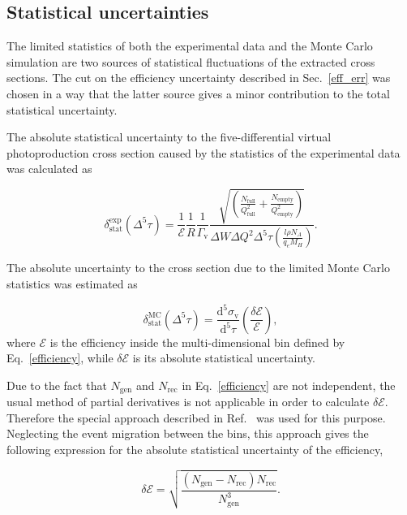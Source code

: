 \documentclass[prc,twocolumn,superscriptaddress,showpacs,amssymb,amsmath,amsfonts,aps,nofootinbib]{revtex4-1}
\begin{document}
\subsection{Statistical uncertainties}
\label{stat_unc}

The limited statistics of both the experimental data and the Monte Carlo simulation  are two sources of statistical fluctuations of the extracted cross sections.
The cut on the efficiency uncertainty described in Sec.~\ref{eff_err} was chosen in a way that the latter source gives a minor contribution to the total statistical uncertainty.


The absolute statistical  uncertainty to the five-differential
virtual photoproduction cross section caused by the statistics of the experimental data was calculated as

 \begin{equation}
\delta_{\text{stat}}^{\text{exp}}(\Delta^{5} \tau) = \frac{1}{\mathcal{E}} \frac{1}{R}
\frac{1}{ \Gamma_{\text{v}} }
\frac{\sqrt{\left( \frac{N_{\text{full}}}{Q_{\text{full}}^{2}}+\frac{N_{\text{empty}}}{Q_{\text{empty}}^{2}} \right) } }{
\Delta W \Delta Q^{2} \Delta^{5} \tau \left( \frac{l \rho N_{A}}{q_{e}M_{H}} \right)}.
\label{staterrors}
\end{equation}


The absolute uncertainty to the cross section due to the limited Monte Carlo statistics was  estimated as

\begin{equation}
\delta_{\text{stat}}^{\text{MC}}(\Delta^{5} \tau) = \frac{\textrm{d}^{5}\sigma_{\text{v}}}{\textrm{d}^{5}\tau} \left( \frac{\delta \mathcal{E}}{\mathcal{E}} \right),
\label{montecarloerror}
\end{equation}
where $\mathcal{E}$ is the efficiency inside the multi-dimensional bin defined by Eq.~\eqref{efficiency}, while $\delta \mathcal{E}$ is its absolute statistical uncertainty. 



Due to the fact that $N_{\text{gen}}$ and $N_{\text{rec}}$ in Eq.~\eqref{efficiency} are not independent, the usual method of partial derivatives is not applicable in order to calculate $\delta \mathcal{E}$.
Therefore the special approach described in Ref.~\cite{Laforge:1996ts} was used for this purpose.
Neglecting the event migration between the bins, this approach gives the following expression for  
 the absolute statistical uncertainty of the efficiency,
 
\begin{equation}
\delta \mathcal{E} =
\sqrt{\frac{(N_{\text{gen}}-N_{\text{rec}})N_{\text{rec}}}{N_{\text{gen}}^{3}}}.
\label{efferror}
\end{equation}
\end{document}
